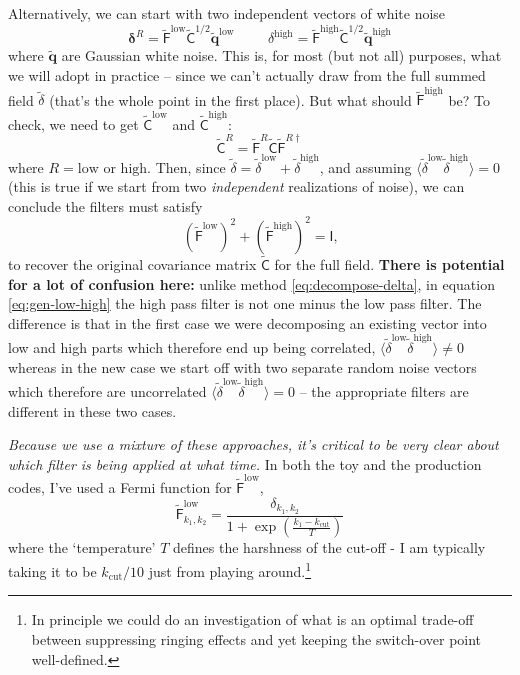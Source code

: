 \documentclass[11pt,a4paper,preprint]{aastex}
\newcommand{\low}{\mathrm{low}}
\newcommand{\high}{\mathrm{high}}
\newcommand{\bmath}[1]{\ensuremath{\bm{#1}}}
\renewcommand{\vec}[1]{\bmath{#1}}
\begin{document}
Alternatively, we can start with two independent vectors of white noise
\begin{equation}
\vec{\delta}^R = \tilde{\mathsf{F}}^{\low} \tilde{\mathsf{C}}^{1/2} \tilde{\vec{q}}^{\low} \hspace{1cm} \delta^{\high} = \tilde{\mathsf{F}}^{\high} \tilde{\mathsf{C}}^{1/2} \tilde{\vec{q}}^{\high}\label{eq:gen-low-high}
\end{equation}
where $\tilde{\vec{q}}$ are Gaussian white
noise. This is, for most (but not all) purposes, what we will adopt in practice -- since
we can't actually draw from the full summed field $\tilde{\delta}$ (that's the whole point in the first place).
But what should $\tilde{\mathsf{F}}^{\high}$ be? To check, we need to
get $\tilde{\mathsf{C}}^{\low}$ and $\tilde{\mathsf{C}}^{\high}$:
\begin{equation}
\tilde{\mathsf{C}}^R = \tilde{\mathsf{F}}^R \tilde{\mathsf{C}} \tilde{\mathsf{F}}^{R\dagger}
\end{equation}
where $R=\low$ or $\high$. Then, since $\tilde{\delta} = \tilde{\delta}^{\low} + \tilde{\delta}^{\high}$,
and assuming $\langle \tilde{\delta}^{\low} \tilde{\delta}^{\high}\rangle = 0$ (this is true if we start
from two {\it independent} realizations of noise), we can conclude the filters must satisfy
\begin{equation}
(\tilde{\mathsf{F}}^{\low})^2+ (\tilde{\mathsf{F}}^{\high})^2 = \mathsf{I}\textrm{,}
\end{equation}
to recover the original covariance matrix $\tilde{\mathsf{C}}$ for the full
field. {\bf There is  potential for a lot of confusion here: } unlike method \eqref{eq:decompose-delta},
in equation \eqref{eq:gen-low-high}  the high pass filter
is not one minus the low pass filter. The difference is that in the first case
we were decomposing an existing vector into low and high parts which therefore end
up being correlated, $\langle \tilde{\delta}^{\low} \tilde{\delta}^{\high} \rangle \ne 0$ whereas in the
new case we start off with two separate random noise vectors which therefore are
uncorrelated  $\langle \tilde{\delta}^{\low} \tilde{\delta}^{\high} \rangle = 0$  -- the appropriate
filters are different in these two cases.

{\it Because we use a mixture of these
approaches, it's critical to be very clear about which filter is being
applied at what time.} In both the toy and the production codes, I've used
a Fermi function for $\tilde{\mathsf{F}}^{\low}$,
\begin{equation}
  \tilde{\mathsf{F}}^{\low}_{k_1, k_2}=\frac{\delta_{k_1,k_2}}{1+\exp\left(\frac{k_1-k_{\mathrm{cut}}}{T}\right)}\label{eq:fermi}
\end{equation}
where the `temperature' $T$ defines the harshness of the cut-off - I am typically
taking it to be $k_{\mathrm{cut}}/10$ just from playing around.\footnote{In principle
we could do an investigation of what is an optimal trade-off between
suppressing ringing effects and yet keeping the switch-over point well-defined.}
\end{document}
